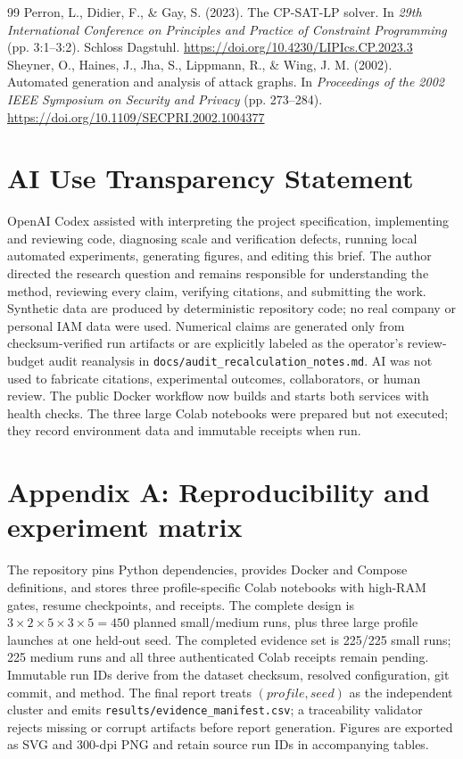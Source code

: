 \documentclass[10pt]{article}
\begin{document}
\begin{thebibliography}{99}
 Perron, L., Didier, F., \& Gay, S. (2023). The CP-SAT-LP solver. In \textit{29th International Conference on Principles and Practice of Constraint Programming} (pp. 3:1--3:2). Schloss Dagstuhl. \url{https://doi.org/10.4230/LIPIcs.CP.2023.3}
 Sheyner, O., Haines, J., Jha, S., Lippmann, R., \& Wing, J. M. (2002). Automated generation and analysis of attack graphs. In \textit{Proceedings of the 2002 IEEE Symposium on Security and Privacy} (pp. 273--284). \url{https://doi.org/10.1109/SECPRI.2002.1004377}
\end{thebibliography}

\section*{AI Use Transparency Statement}
OpenAI Codex assisted with interpreting the project specification, implementing and reviewing code, diagnosing scale and verification defects, running local automated experiments, generating figures, and editing this brief. The author directed the research question and remains responsible for understanding the method, reviewing every claim, verifying citations, and submitting the work. Synthetic data are produced by deterministic repository code; no real company or personal IAM data were used. Numerical claims are generated only from checksum-verified run artifacts or are explicitly labeled as the operator's review-budget audit reanalysis in \texttt{docs/audit\_recalculation\_notes.md}. AI was not used to fabricate citations, experimental outcomes, collaborators, or human review. The public Docker workflow now builds and starts both services with health checks. The three large Colab notebooks were prepared but not executed; they record environment data and immutable receipts when run.

\section*{Appendix A: Reproducibility and experiment matrix}
The repository pins Python dependencies, provides Docker and Compose definitions, and stores three profile-specific Colab notebooks with high-RAM gates, resume checkpoints, and receipts. The complete design is $3\times2\times5\times3\times5=450$ planned small/medium runs, plus three large profile launches at one held-out seed. The completed evidence set is 225/225 small runs; 225 medium runs and all three authenticated Colab receipts remain pending. Immutable run IDs derive from the dataset checksum, resolved configuration, git commit, and method. The final report treats $(profile, seed)$ as the independent cluster and emits \texttt{results/evidence\_manifest.csv}; a traceability validator rejects missing or corrupt artifacts before report generation. Figures are exported as SVG and 300-dpi PNG and retain source run IDs in accompanying tables.
\end{document}
